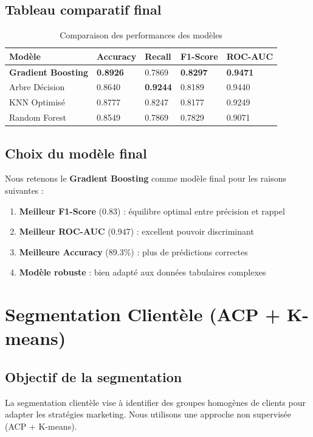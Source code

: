 \documentclass[11pt,a4paper]{article}
\begin{document}
\subsection{Tableau comparatif final}

\begin{table}[H]
\centering
\begin{tabular}{L{4cm} C{2.5cm} C{2.5cm} C{2.5cm} C{2.5cm}}
\toprule
\textbf{Modèle} & \textbf{Accuracy} & \textbf{Recall} & \textbf{F1-Score} & \textbf{ROC-AUC} \\
\midrule
\textbf{Gradient Boosting} & \textbf{0.8926} & 0.7869 & \textbf{0.8297} & \textbf{0.9471} \\
Arbre Décision & 0.8640 & \textbf{0.9244} & 0.8189 & 0.9440 \\
KNN Optimisé & 0.8777 & 0.8247 & 0.8177 & 0.9249 \\
Random Forest & 0.8549 & 0.7869 & 0.7829 & 0.9071 \\
\bottomrule
\end{tabular}
\caption{Comparaison des performances des modèles}
\end{table}

\subsection{Choix du modèle final}
Nous retenons le \textbf{Gradient Boosting} comme modèle final pour les raisons suivantes :

\begin{enumerate}
    \item \textbf{Meilleur F1-Score} (0.83) : équilibre optimal entre précision et rappel
    \item \textbf{Meilleur ROC-AUC} (0.947) : excellent pouvoir discriminant
    \item \textbf{Meilleure Accuracy} (89.3\%) : plus de prédictions correctes
    \item \textbf{Modèle robuste} : bien adapté aux données tabulaires complexes
\end{enumerate}

\newpage
\section{Segmentation Clientèle (ACP + K-means)}

\subsection{Objectif de la segmentation}
La segmentation clientèle vise à identifier des groupes homogènes de clients pour 
adapter les stratégies marketing. Nous utilisons une approche non supervisée 
(ACP + K-means).
\end{document}
